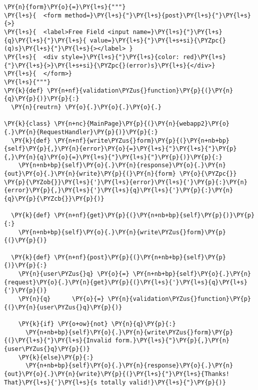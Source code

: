 \begin{Verbatim}[commandchars=\\\{\}]
\PY{n}{form}\PY{o}{=}\PY{l+s}{"""}
\PY{l+s}{  <form method=}\PY{l+s}{"}\PY{l+s}{post}\PY{l+s}{"}\PY{l+s}{>}
\PY{l+s}{  <label>Free Field <input name=}\PY{l+s}{"}\PY{l+s}{q}\PY{l+s}{"}\PY{l+s}{ value=}\PY{l+s}{"}\PY{l+s+si}{\PYZpc{}(q)s}\PY{l+s}{"}\PY{l+s}{></label> }
\PY{l+s}{  <div style=}\PY{l+s}{"}\PY{l+s}{color: red}\PY{l+s}{"}\PY{l+s}{>}\PY{l+s+si}{\PYZpc{}(error)s}\PY{l+s}{</div>}
\PY{l+s}{  </form>}
\PY{l+s}{"""}
\PY{k}{def} \PY{n+nf}{validation\PYZus{}function}\PY{p}{(}\PY{n}{q}\PY{p}{)}\PY{p}{:}
  \PY{n}{reutrn} \PY{o}{.}\PY{o}{.}\PY{o}{.}

\PY{k}{class} \PY{n+nc}{MainPage}\PY{p}{(}\PY{n}{webapp2}\PY{o}{.}\PY{n}{RequestHandler}\PY{p}{)}\PY{p}{:}
  \PY{k}{def} \PY{n+nf}{write\PYZus{}form}\PY{p}{(}\PY{n+nb+bp}{self}\PY{p}{,}\PY{n}{error}\PY{o}{=}\PY{l+s}{"}\PY{l+s}{"}\PY{p}{,}\PY{n}{q}\PY{o}{=}\PY{l+s}{"}\PY{l+s}{"}\PY{p}{)}\PY{p}{:}
    \PY{n+nb+bp}{self}\PY{o}{.}\PY{n}{response}\PY{o}{.}\PY{n}{out}\PY{o}{.}\PY{n}{write}\PY{p}{(}\PY{n}{form} \PY{o}{\PYZpc{}} \PY{p}{\PYZob{}}\PY{l+s}{'}\PY{l+s}{error}\PY{l+s}{'}\PY{p}{:}\PY{n}{error}\PY{p}{,}\PY{l+s}{'}\PY{l+s}{q}\PY{l+s}{'}\PY{p}{:}\PY{n}{q}\PY{p}{\PYZcb{}}\PY{p}{)}

  \PY{k}{def} \PY{n+nf}{get}\PY{p}{(}\PY{n+nb+bp}{self}\PY{p}{)}\PY{p}{:}
    \PY{n+nb+bp}{self}\PY{o}{.}\PY{n}{write\PYZus{}form}\PY{p}{(}\PY{p}{)}

  \PY{k}{def} \PY{n+nf}{post}\PY{p}{(}\PY{n+nb+bp}{self}\PY{p}{)}\PY{p}{:}
    \PY{n}{user\PYZus{}q} \PY{o}{=} \PY{n+nb+bp}{self}\PY{o}{.}\PY{n}{request}\PY{o}{.}\PY{n}{get}\PY{p}{(}\PY{l+s}{'}\PY{l+s}{q}\PY{l+s}{'}\PY{p}{)}
    \PY{n}{q}      \PY{o}{=} \PY{n}{validation\PYZus{}function}\PY{p}{(}\PY{n}{user\PYZus{}q}\PY{p}{)}
  
    \PY{k}{if} \PY{o+ow}{not} \PY{n}{q}\PY{p}{:}
      \PY{n+nb+bp}{self}\PY{o}{.}\PY{n}{write\PYZus{}form}\PY{p}{(}\PY{l+s}{"}\PY{l+s}{Invalid form.}\PY{l+s}{"}\PY{p}{,}\PY{n}{user\PYZus{}q}\PY{p}{)}
    \PY{k}{else}\PY{p}{:}
      \PY{n+nb+bp}{self}\PY{o}{.}\PY{n}{response}\PY{o}{.}\PY{n}{out}\PY{o}{.}\PY{n}{write}\PY{p}{(}\PY{l+s}{"}\PY{l+s}{Thanks! That}\PY{l+s}{'}\PY{l+s}{s totally valid!}\PY{l+s}{"}\PY{p}{)}
\end{Verbatim}
